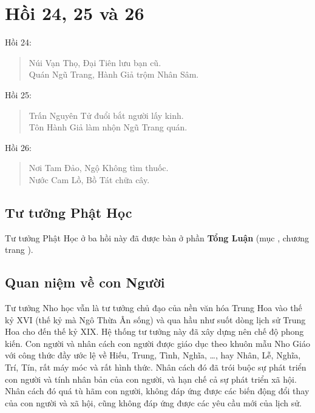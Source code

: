 \chapter{Hồi 24, 25 và 26} %
\label{cha:hoi_24_25_26}

Hồi 24:

\begin{verse}
\begin{itshape}
Núi Vạn Thọ, Đại Tiên lưu bạn cũ.\\
Quán Ngũ Trang, Hành Giả trộm Nhân Sâm.
\end{itshape}
\end{verse}

Hồi 25:

\begin{verse}
\begin{itshape}
Trấn Nguyên Tử đuổi bắt người lấy kinh.\\
Tôn Hành Giả làm nhộn Ngũ Trang quán.
\end{itshape}
\end{verse}

Hồi 26:

\begin{verse}
\begin{itshape}
Nơi Tam Đảo, Ngộ Không tìm thuốc.\\
Nước Cam Lồ, Bồ Tát chữa cây.
\end{itshape}
\end{verse}

\section{Tư tưởng Phật Học} %
\label{sec:24_25_26_phat_hoc}

Tư tưởng Phật Học ở ba hồi này đã được bàn ở phần {\bf Tổng Luận} (mục , chương  trang \pageref{sec:bieu_tuong_cua_hoi_thu_26}).

\section{Quan niệm về con Người} %
\label{sec:24_25_26_con_nguoi}

Tư tưởng Nho học vẫn là tư tưởng chủ đạo của nền văn hóa Trung Hoa vào thế kỷ XVI (thế kỷ mà Ngô Thừa Ân sống) và qua hầu như suốt dòng lịch sử Trung Hoa cho đến thế kỷ XIX. Hệ thống tư tưởng này đã xây dựng nên chế độ phong kiến. Con người và nhân cách con người được giáo dục theo khuôn mẫu Nho Giáo với công thức đầy ước lệ về Hiếu, Trung, Tình, Nghĩa, \ldots, hay Nhân, Lễ, Nghĩa, Trí, Tín, rất máy móc và rất hình thức. Nhân cách đó đã trói buộc sự phát triển con người và tính nhân bản của con người, và hạn chế cả sự phát triển xã hội. Nhân cách đó quá tù hãm con người, không đáp ứng được các biến động đổi thay của con người và xã hội, cũng không đáp ứng được các yêu cầu mới của lịch sử.

